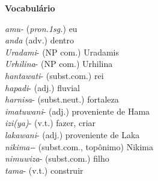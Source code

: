 \noindent\textbf{Vocabulário}
\begin{multicols}{2}
	\noindent \emph{amu-} (\emph{pron.1sg.}) eu\\
	\noindent \emph{anda} (adv.) dentro\\
	\noindent \emph{Uradami}- (NP com.) Uradamis\\
	\noindent \emph{Urhilina}- (NP com.) Urhilina\\
	\noindent \emph{hantawati}- (subst.com.) rei\\
	\noindent \emph{hapadi}- (adj.) fluvial\\
	\noindent \emph{harnisa}- (subst.neut.) fortaleza\\
	\noindent \emph{imatuwani}- (adj.) proveniente de Hama\\
	\noindent \emph{izi{(ya)}}- (v.t.) fazer, criar\\
	\noindent \emph{lakawani}- (adj.) proveniente de Laka\\
	\noindent \emph{nikima-}- (subst.com., topônimo) Nikima\\
	\noindent \emph{nimuwiza}- (subst.com.) filho\\
	\noindent \emph{tama}- (v.t.) construir
\end{multicols}

